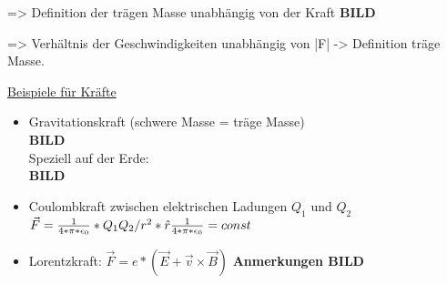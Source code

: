 => Definition der tr\"agen Masse unabh\"angig von der Kraft
\textbf{BILD}

=> Verh\"altnis der Geschwindigkeiten unabh\"angig von |F| -> Definition tr\"age Masse.

\underline{Beispiele f\"ur Kr\"afte}
\begin{itemize}
  \item Gravitationskraft (schwere Masse = tr\"age Masse)\\
        \textbf{BILD}\\
        Speziell auf der Erde:\\ \textbf{BILD}
  \item Coulombkraft zwischen elektrischen Ladungen $Q_{1}$ und $Q_{2}$\\
        \(\vec{F} = \frac{1}{4*\pi*\epsilon_{0}} * Q_{1}Q_{2}/r^{2} * \hat{r}\\
        \frac{1}{4*\pi*\epsilon_{0}} = const\)
  \item Lorentzkraft: $\vec{F} = e * (\vec{E} + \vec{v} \times \vec{B})$ \textbf{Anmerkungen BILD}
\end{itemize}